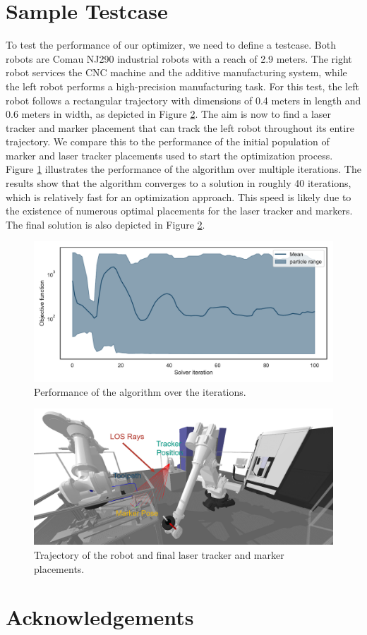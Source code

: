 \documentclass{svproc}
\begin{document}
\section{Sample Testcase}
To test the performance of our optimizer, we need to define a testcase.
Both robots are Comau NJ290 industrial robots with a reach of 2.9 meters.
The right robot services the CNC machine and the additive manufacturing system, while the left robot performs a high-precision manufacturing task.
For this test, the left robot follows a rectangular trajectory with dimensions of 0.4 meters in length and 0.6 meters in width, as depicted in Figure \ref{fig:trajectory}.
The aim is now to find a laser tracker and marker placement that can track the left robot throughout its entire trajectory.
We compare this to the performance of the initial population of marker and laser tracker placements used to start the optimization process.
Figure \ref{fig:iterations} illustrates the performance of the algorithm over multiple iterations.
The results show that the algorithm converges to a solution in roughly 40 iterations, which is relatively fast for an optimization approach.
This speed is likely due to the existence of numerous optimal placements for the laser tracker and markers.
The final solution is also depicted in Figure \ref{fig:trajectory}.

\begin{figure}
\centering
\includegraphics[width=\textwidth]{figures/iterations.pdf}
\caption{Performance of the algorithm over the iterations.}
\label{fig:iterations}
\end{figure}

\begin{figure}
\centering
\includegraphics[width=\textwidth]{figures/trajectory.png}
\caption{Trajectory of the robot and final laser tracker and marker placements.}
\label{fig:trajectory}
\end{figure}

\section{Acknowledgements}

\printbibliography
\end{document}

